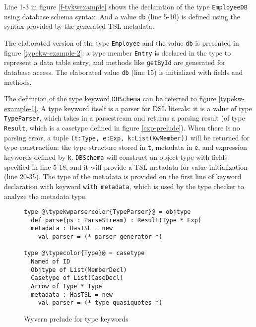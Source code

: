 \documentclass{sig-alternate}
\newcommand{\typekwparsercolor}[1]{\textcolor[HTML]{7C803E}{#1}}
\newcommand{\typecolor}[1]{\textcolor[HTML]{660066}{#1}}
\newcommand{\mycaption}[1]{\vspace{-4px}\caption{#1}\vspace{-2px}}
\begin{document}
Line 1-3 in figure \ref{f-tykwexample} shows the declaration of the type \verb|EmployeeDB| using database schema syntax. And a value \verb|db| (line 5-10) is defined using the syntax provided by the generated TSL metadata. 

The elaborated version of the type \verb|Employee| and the value \verb|db| is presented in figure \ref{typekw-example-2}: a type member \verb|Entry| is declared in the type to represent a data table entry, and methods like \verb|getById| are generated for database access. The elaborated value \verb|db| (line 15) is initialized with fields and methods.

The definition of the type keyword \verb|DBSchema| can be referred to figure \ref{typekw-example-1}. A type keyword itself is a parser for DSL literals: it is a value of type \verb|TypeParser|, which takes in a parsestream and returns a parsing result (of type \verb|Result|, which is a casetype defined in figure \ref{exp-prelude}). When there is no parsing error, a tuple \verb|(t:Type, e:Exp, k:List(KwMember))| will be returned for type construction: the type structure stored in \verb|t|, metadata in \verb|e|, and expression keywords defined by \verb|k|. \verb|DBSchema| will construct an object type with fields specified in line 5-18, and it will provide a TSL metadata for value initialization (line 20-35). The type of the metadata is provided on the first line of keyword declaration with keyword \verb|with metadata|, which is used by the type checker to analyze the metadata type.




\begin{figure}
\begin{lstlisting}[style=wyvern]
type @\typekwparsercolor{TypeParser}@ = objtype
  def parse(ps : ParseStream) : Result(Type * Exp)
  metadata : HasTSL = new 
    val parser = (* parser generator *)

type @\typecolor{Type}@ = casetype
  Named of ID
  Objtype of List(MemberDecl)
  Casetype of List(CaseDecl)
  Arrow of Type * Type
  metadata : HasTSL = new
    val parser = (* type quasiquotes *)
\end{lstlisting}
\mycaption{Wyvern prelude for type keywords}
\label{type-prelude}
\end{figure}
\end{document}
